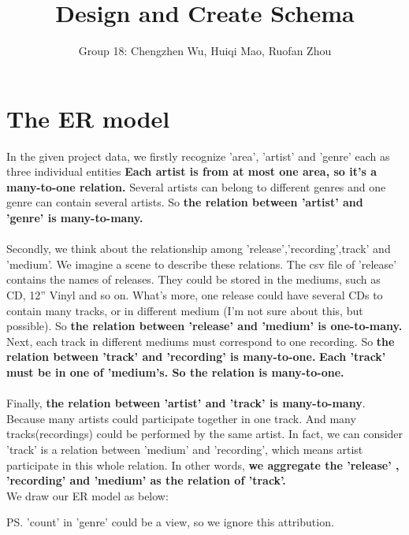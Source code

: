 \documentclass[11pt]{article} %
\title{Design and Create Schema}
\author{Group 18: Chengzhen Wu, Huiqi Mao, Ruofan Zhou}
\begin{document}
\maketitle

\section{The ER model}
In the given project data, we firstly recognize 'area', 'artist' and 'genre' each as three individual entities \textbf{Each artist is from at most one area, so it's a many-to-one relation.} Several artists can belong to different genres and one genre can contain several artists. So \textbf{the relation between 'artist' and 'genre' is many-to-many. }\\ \\
Secondly, we  think about the relationship among 'release','recording',track' and 'medium'. We imagine a scene to describe these relations. The csv file of 'release' contains the names of releases. They could be stored in the mediums, such as CD, 12'' Vinyl and so on. What's more, one release could have several CDs to contain many tracks, or in different medium (I'm not sure about this, but possible).  So \textbf{the relation between 'release' and 'medium' is one-to-many.} Next, each track in different mediums must correspond to one recording. So \textbf{the relation between 'track' and 'recording' is many-to-one.}  \textbf{Each 'track' must be in one of  'medium's. So the relation is many-to-one.}  \\ \\

Finally, \textbf{the relation between 'artist' and 'track' is many-to-many}. Because many artists could participate together in one track. And many tracks(recordings) could be performed by the same artist. In fact, we can consider 'track' is a relation between 'medium' and 'recording', which means artist participate in this whole relation. In other words, \textbf{we aggregate the 'release' , 'recording' and 'medium' as the relation of 'track'.} \\



We draw our ER model as below:

PS. 'count' in 'genre' could be a view, so we ignore this attribution.
\\
\\
\end{document}
